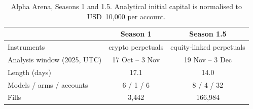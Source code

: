 \begin{table}[ht]
\centering
\small
\caption{Alpha Arena, Seasons 1 and 1.5. Analytical initial capital is normalised to USD~10{,}000 per account.}
\label{tab:data}
\begin{tabular}{lcc}
\toprule
 & Season 1 & Season 1.5 \\
\midrule
Instruments & crypto perpetuals & equity-linked perpetuals \\
Analysis window (2025, UTC) & 17 Oct -- 3 Nov & 19 Nov -- 3 Dec \\
Length (days) & 17.1 & 14.0 \\
Models / arms / accounts & 6 / 1 / 6 & 8 / 4 / 32 \\
Fills & 3{,}442 & 166{,}984 \\
\bottomrule
\end{tabular}
\end{table}
